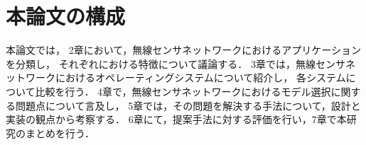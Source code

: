 
\section{本論文の構成}

本論文では，
2章において，無線センサネットワークにおけるアプリケーションを分類し，
それぞれにおける特徴について議論する．
3章では，無線センサネットワークにおけるオペレーティングシステムについて紹介し，
各システムについて比較を行う．
4章で，無線センサネットワークにおけるモデル選択に関する問題点について言及し，
5章では，その問題を解決する手法について，設計と実装の観点から考察する．
6章にて，提案手法に対する評価を行い，7章で本研究のまとめを行う．

